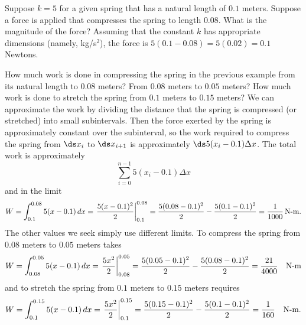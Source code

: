 \begin{example} Suppose $k=5$ for a given spring that has a natural length of
$0.1$ meters. Suppose a force is applied that compresses the spring to
length $0.08$. What is the magnitude of the force? Assuming that the
constant $k$ has appropriate dimensions (namely, kg/s$^2$), the force is
$5(0.1-0.08)=5(0.02)=0.1$ Newtons.
\end{example}

\begin{example} How much work is done in compressing the spring in the
previous example from its natural length to $0.08$ meters? From $0.08$
meters to $0.05$ meters? How much work is done to stretch the spring
from $0.1$ meters to $0.15$ meters?  We can approximate the work by
dividing the distance that the spring is compressed (or stretched)
into small subintervals. Then the force exerted by the spring is
approximately constant over the subinterval, so the work required to
compress the spring from $\ds x_i$ to $\ds x_{i+1}$ is approximately
$\ds 5(x_i-0.1)\Delta x$.  The total work is approximately
$$\sum_{i=0}^{n-1} 5(x_i-0.1)\Delta x$$
and in the limit
$$W=\int_{0.1}^{0.08} 5(x-0.1)\,dx=\left.{5(x-0.1)^2\over2}\right|_{0.1}^{0.08}=
{5(0.08-0.1)^2\over2}-{5(0.1-0.1)^2\over2}={1\over1000}\,\hbox{N-m}.$$
The other values we seek simply use different limits. To compress the
spring from $0.08$
meters to $0.05$ meters takes
$$W=\int_{0.08}^{0.05} 5(x-0.1)\,dx=\left.{5x^2\over2}\right|_{0.08}^{0.05}=
{5(0.05-0.1)^2\over2}-{5(0.08-0.1)^2\over2}={21\over4000}\quad\hbox{N-m}$$
and to stretch the spring
from $0.1$ meters to $0.15$ meters requires
$$W=\int_{0.1}^{0.15} 5(x-0.1)\,dx=\left.{5x^2\over2}\right|_{0.1}^{0.15}=
{5(0.15-0.1)^2\over2}-{5(0.1-0.1)^2\over2}={1\over160}\quad\hbox{N-m}.$$
\end{example}

